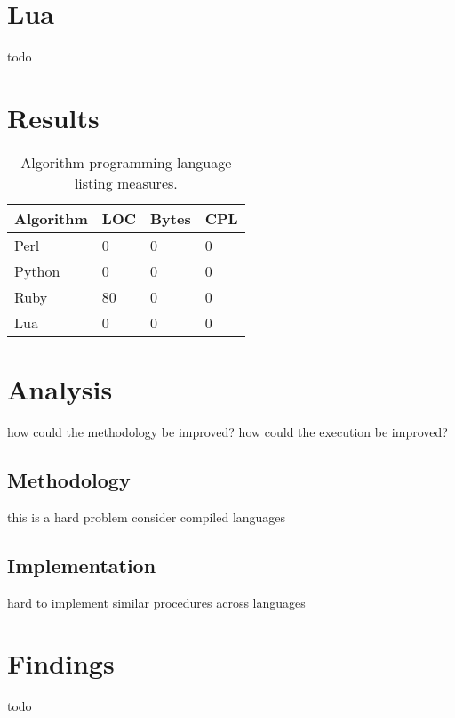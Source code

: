 \documentclass[a4paper, 11pt]{article}
\begin{document}
\section{Lua}
\label{sec:lua}
todo

% 
% 
\section{Results}
\label{sec:results}

\begin{table}[ht]
	\centering
		\begin{tabularx}{\textwidth}{lXXX}
		\toprule
		\textbf{Algorithm} & \textbf{LOC} & \textbf{Bytes} & \textbf{CPL} \\ 
		\toprule
		Perl & 0 & 0 & 0 \\
		Python & 0 & 0 & 0 \\
		Ruby & 80 & 0 & 0 \\
		Lua & 0 & 0 & 0 \\
		\bottomrule
		\end{tabularx}	
	\caption{Algorithm programming language listing measures.}
	\label{tab:implementation_results}
\end{table}


% 
% 
\section{Analysis}
\label{sec:analysis}
how could the methodology be improved?
how could the execution be improved?


\subsection{Methodology}
this is a hard problem
consider compiled languages


\subsection{Implementation}
hard to implement similar procedures across languages


% 
% 
\section{Findings}
\label{sec:findings}
todo





\end{document}
